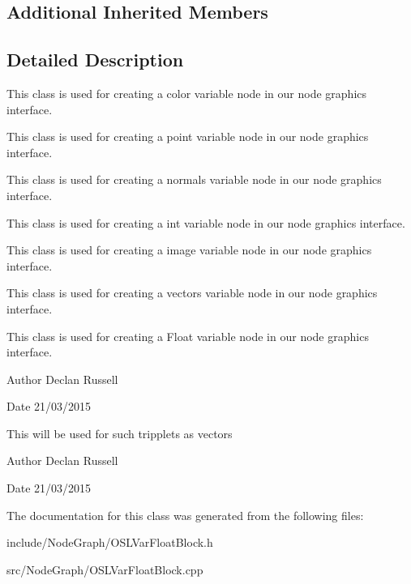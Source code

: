\subsection*{Additional Inherited Members}


\subsection{Detailed Description}
This class is used for creating a color variable node in our node graphics interface. 

This class is used for creating a point variable node in our node graphics interface.

This class is used for creating a normals variable node in our node graphics interface.

This class is used for creating a int variable node in our node graphics interface.

This class is used for creating a image variable node in our node graphics interface.

This class is used for creating a vectors variable node in our node graphics interface.

This class is used for creating a Float variable node in our node graphics interface.

\begin{DoxyAuthor}{Author}
Declan Russell 
\end{DoxyAuthor}
\begin{DoxyDate}{Date}
21/03/2015
\end{DoxyDate}
This will be used for such tripplets as vectors \begin{DoxyAuthor}{Author}
Declan Russell 
\end{DoxyAuthor}
\begin{DoxyDate}{Date}
21/03/2015 
\end{DoxyDate}


The documentation for this class was generated from the following files\-:\begin{DoxyCompactItemize}
\item 
include/\-Node\-Graph/O\-S\-L\-Var\-Float\-Block.\-h\item 
src/\-Node\-Graph/O\-S\-L\-Var\-Float\-Block.\-cpp\end{DoxyCompactItemize}
